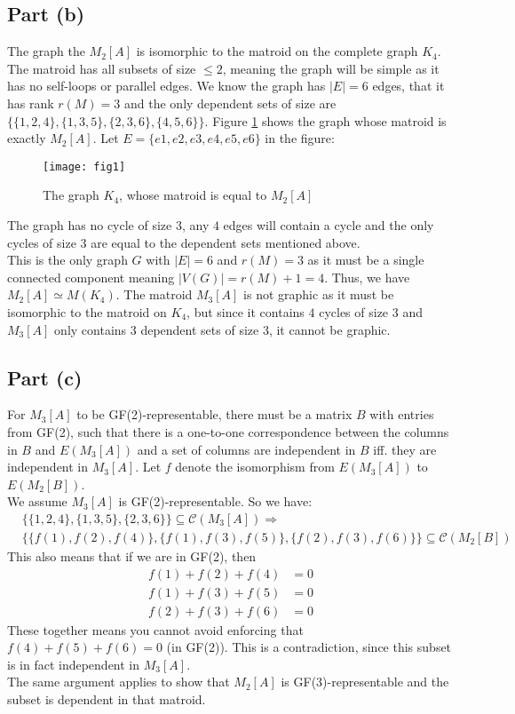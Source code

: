 \documentclass[a4paper, fleqn]{article}
\begin{document}
\subsection*{Part (b)}
The graph the $M_2[A]$ is isomorphic to the matroid on the complete graph $K_4$.
The matroid has all subsets of size $\leq 2$, meaning the graph will be simple as it has no self-loops or parallel edges. We know the graph has $|E|=6$ edges, that it has rank $r(M)=3$ and the only dependent sets of size are $\{\{1,2,4\}, \{1,3,5\},\{2,3,6\}, \{4,5,6\}\}$. Figure \ref{fig1} shows the graph whose matroid is exactly $M_2[A]$. Let $E=\{e1, e2, e3, e4, e5, e6\}$ in the figure:
\begin{figure}[H]
  \centering
  \texttt{[image: fig1]}
  \caption{The graph $K_4$, whose matroid is equal to $M_2[A]$}
  \label{fig1}
\end{figure}
The graph has no cycle of size $3$, any $4$ edges will contain a cycle and the only cycles of size $3$ are equal to the dependent sets mentioned above. \\
This is the only graph $G$ with $|E|=6$ and $r(M)=3$ as it must be a single connected component meaning $|V(G)|=r(M)+1=4$.  Thus, we have $M_2[A]\simeq M(K_4)$. The matroid $M_3[A]$ is not graphic as it must be isomorphic to the matroid on $K_4$, but since it contains $4$ cycles of size $3$ and $M_3[A]$ only contains $3$ dependent sets of size $3$, it cannot be graphic.

\subsection*{Part (c)}
For $M_3[A]$ to be GF(2)-representable, there must be a matrix $B$ with entries from GF(2), such that there is a one-to-one correspondence between the columns in $B$ and $E(M_3[A])$ and a set of columns are independent in $B$ iff. they are independent in $M_3[A]$. Let $f$ denote the isomorphism from $E(M_3[A])$ to $E(M_2[B])$.\\
We assume $M_3[A]$ is GF(2)-representable. So we have:
\begin{align*}
  &\{\{1,2,4\}, \{1,3,5\}, \{2,3,6\}\}\subseteq \mathcal{C}(M_3[A]) \Rightarrow\\
  & \{\{f(1),f(2),f(4)\}, \{f(1),f(3),f(5)\}, \{f(2),f(3),f(6)\}\} \subseteq \mathcal{C}(M_2[B])
\end{align*}
This also means that if we are in GF(2), then
\begin{align*}
  f(1)+f(2)+f(4)&=0 \\
  f(1)+f(3)+f(5)&=0 \\
  f(2)+f(3)+f(6)&=0
\end{align*}
These together means you cannot avoid enforcing that $f(4)+f(5)+f(6)=0$ (in GF(2)). This is a contradiction, since this subset is in fact independent in $M_3[A]$. \\
The same argument applies to show that $M_2[A]$ is GF(3)-representable and the subset is dependent in that matroid.
\end{document}
